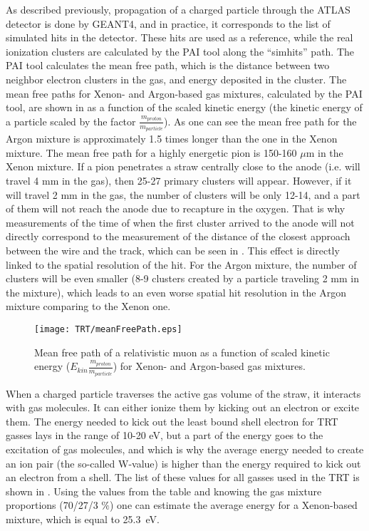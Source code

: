 As described previously, propagation of a charged particle through the ATLAS detector is done by GEANT4, and in practice, it corresponds to the list of simulated hits in the detector.
These hits are used as a reference, while the real ionization clusters are calculated by the PAI tool along the ``simhits'' path.
The PAI tool calculates the mean free path, which is the distance between two neighbor electron clusters in the gas, and energy deposited in the cluster. 
The mean free paths for Xenon- and Argon-based gas mixtures, calculated by the PAI tool, are shown in  as a function of the scaled kinetic energy 
(the kinetic energy of a particle scaled by the factor $\frac{m_{proton}}{m_{particle}}$). As one can see the mean free path for the Argon mixture is approximately 1.5 times longer than the one in the Xenon mixture.
The mean free path for a highly energetic pion is 150-160 $\mu$m in the Xenon mixture. If a pion penetrates a straw centrally close to the anode (i.e. will travel 4 mm in the gas), then 25-27 primary clusters will appear.
However, if it will travel 2 mm in the gas, the number of clusters will be only 12-14, and a part of them will not reach the anode due to recapture in the oxygen. 
That is why measurements of the time of when the first cluster arrived to the anode will not directly correspond to the measurement of the distance of the closest approach between the wire and the track, 
which can be seen in . This effect is directly linked to the spatial resolution of the hit.
For the Argon mixture, the number of clusters will be even smaller (8-9 clusters created by a particle traveling 2 mm in the mixture), which leads to an even worse spatial hit resolution in the Argon mixture comparing 
to the Xenon one.

\begin{figure}
\centering
 \texttt{[image: TRT/meanFreePath.eps]}
\caption{Mean free path of a relativistic muon as a function of scaled kinetic energy ($E_{kin}\frac{m_{proton}}{m_{particle}}$) for Xenon- and Argon-based gas mixtures.}
\label{fig:meanFreePath}
\end{figure}

When a charged particle traverses the active gas volume of the straw, it interacts with gas molecules.
It can either ionize them by kicking out an electron or excite them. The energy needed to kick out the least bound shell electron for TRT gasses lays
in the range of 10-20 eV, but a part of the energy goes to the excitation of gas molecules, and which is why the average energy needed to create an ion pair (the so-called W-value) is higher than the energy required to kick out an electron from a shell. The list of these values for all gasses used in the TRT is shown in .
Using the values from the table and knowing the gas mixture proportions (70/27/3 $\%$) one can estimate the average energy for a Xenon-based mixture, which is equal to 25.3~eV.

